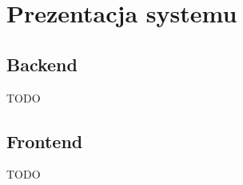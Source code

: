 
\chapter{Prezentacja systemu}
\label{ch:prezentacja-systemu}

\section{Backend}
\label{sec:prezentacja-backend}

TODO

\section{Frontend}
\label{sec:prezentacja-frontend}

TODO
